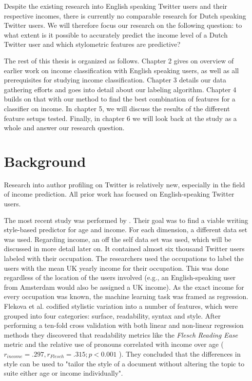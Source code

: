 \documentclass[
10pt, %
a4paper, %
oneside, %
headinclude,footinclude, %
] {book}%
\begin{document}
Despite the existing research into English speaking Twitter users and their respective incomes, there is currently no comparable research for Dutch speaking Twitter users. We will therefore focus our research on the following question: to what extent is it possible to accurately predict the income level of a Dutch Twitter user and which stylometric features are predictive?

The rest of this thesis is organized as follows. Chapter 2 gives on overview of earlier work on income classification with English speaking users, as well as all prerequisites for studying income classification. Chapter 3 details our data gathering efforts and goes into detail about our labeling algorithm. Chapter 4 builds on that with our method to find the best combination of features for a classifier on income. In chapter 5, we will discuss the results of the different feature setups tested. Finally, in chapter 6 we will look back at the study as a whole and answer our research question.

\chapter{Background}
Research into author profiling on Twitter is relatively new, especially in the field of income prediction. All prior work has focused on English-speaking Twitter users.

The most recent study was performed by \citet{flekova}. Their goal was to find a viable writing style-based predictor for age and income. For each dimension, a different data set was used. 
Regarding income, an off the self data set was used, which will be discussed in more detail later on. It contained almost six thousand Twitter users labeled with their occupation. The researchers used the occupations to label the users with the mean UK yearly income for their occupation. This was done regardless of the location of the users involved (e.g., an English-speaking user from Amsterdam would also be assigned a UK income). 
As the exact income for every occupation was known, the machine learning task was framed as regression. Flekova et al. codified stylistic variation into a number of features, which were grouped into four categories: surface, readability, syntax and style. 
After performing a ten-fold cross validation with both linear and non-linear regression methods they discovered that readability metrics like the \textit{Flesch Reading Ease} metric and the relative use of pronouns correlated with income over age (\(r_{income} = .297,  r_{Flesch} = .315;  p < 0.001 \) ). They concluded that the differences in style can be used to "tailor the style of a document without altering the topic to suite either age or income individually".
\end{document}
